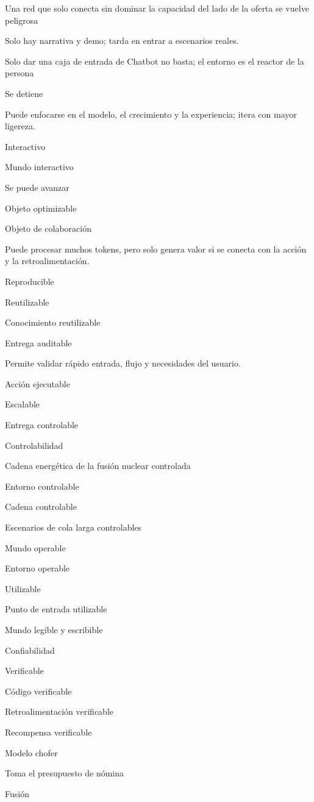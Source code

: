\documentclass{article}
\begin{document}
Una red que solo conecta sin dominar la capacidad del lado de la oferta se vuelve peligrosa

Solo hay narrativa y demo; tarda en entrar a escenarios reales.

Solo dar una caja de entrada de Chatbot no basta; el entorno es el reactor de la persona

Se detiene

Puede enfocarse en el modelo, el crecimiento y la experiencia; itera con mayor ligereza.

Interactivo

Mundo interactivo

Se puede avanzar

Objeto optimizable

Objeto de colaboración

Puede procesar muchos tokens, pero solo genera valor si se conecta con la acción y la retroalimentación.

Reproducible

Reutilizable

Conocimiento reutilizable

Entrega auditable

Permite validar rápido entrada, flujo y necesidades del usuario.

Acción ejecutable

Escalable

Entrega controlable

Controlabilidad

Cadena energética de la fusión nuclear controlada

Entorno controlable

Cadena controlable

Escenarios de cola larga controlables

Mundo operable

Entorno operable

Utilizable

Punto de entrada utilizable

Mundo legible y escribible

Confiabilidad

Verificable

Código verificable

Retroalimentación verificable

Recompensa verificable

Modelo chofer

Toma el presupuesto de nómina

Fusión
\end{document}
